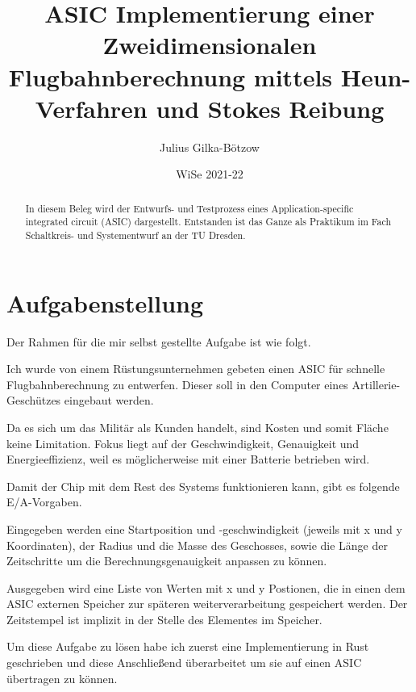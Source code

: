 \documentclass{article}
\title{ASIC Implementierung einer Zweidimensionalen Flugbahnberechnung mittels Heun-Verfahren und Stokes Reibung}
\author{Julius Gilka-Bötzow}
\date{WiSe 2021-22}
\begin{document}
    \begin{titlepage}
        \maketitle
    \end{titlepage}

    \begin{abstract}
        In diesem Beleg wird der Entwurfs- und Testprozess eines Application-specific integrated circuit (ASIC)
        dargestellt. Entstanden ist das Ganze als Praktikum im Fach Schaltkreis- und Systementwurf an der TU Dresden.
    \end{abstract}


    \newpage
    \tableofcontents
    \newpage


    \section{Aufgabenstellung}

    Der Rahmen für die mir selbst gestellte Aufgabe ist wie folgt.

    Ich wurde von einem Rüstungsunternehmen gebeten einen ASIC für schnelle Flugbahnberechnung zu entwerfen.
    Dieser soll in den Computer eines Artillerie-Geschützes eingebaut werden.

    \newblock

    Da es sich um das Militär als Kunden handelt, sind Kosten und somit Fläche keine Limitation.
    Fokus liegt auf der Geschwindigkeit, Genauigkeit und Energieeffizienz, weil es möglicherweise mit einer
    Batterie betrieben wird.

    \newblock

    Damit der Chip mit dem Rest des Systems funktionieren kann, gibt es folgende E/A-Vorgaben.

    Eingegeben werden eine Startposition und -geschwindigkeit (jeweils mit x und y Koordinaten), der Radius
    und die Masse des Geschosses, sowie die Länge der Zeitschritte um die Berechnungsgenauigkeit anpassen zu können.

    Ausgegeben wird eine Liste von Werten mit x und y Postionen, die in einen dem ASIC externen Speicher zur späteren
    weiterverarbeitung gespeichert werden. Der Zeitstempel ist implizit in der Stelle des
    Elementes im Speicher.

    \newblock

    Um diese Aufgabe zu lösen habe ich zuerst eine Implementierung in Rust geschrieben und diese Anschließend
    überarbeitet um sie auf einen ASIC übertragen zu können.
\end{document}
